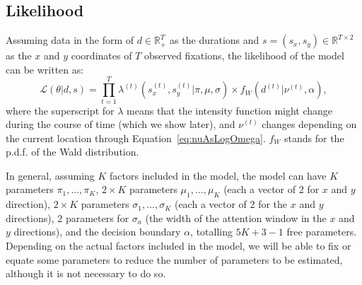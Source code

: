 \documentclass{article}
\begin{document}
\subsection{Likelihood}


Assuming data in the form of $d \in \mathbb{R}_+^T$ as the durations and $s = (s_x, s_y) \in \mathbb{R}^{T\times2}$ as the $x$ and $y$ coordinates of $T$ observed fixations, the likelihood of the model can be written as:
\begin{equation}
    \mathcal{L}(\theta | d, s) = \prod_{t=1}^T \lambda^{(t)}(s_x^{(t)}, s_y^{(t)} | \pi, \mu, \sigma) \times f_{W}(d^{(t)} | \nu^{(t)}, \alpha),
\end{equation}
where the superscript for $\lambda$ means that the intensity function might change during the course of time (which we show later), and $\nu^{(t)}$ changes depending on the current location through Equation~\ref{eq:nuAsLogOmega}. $f_W$ stands for the p.d.f. of the Wald distribution.

In general, assuming $K$ factors included in the model, the model can have $K$ parameters $\pi_1, ..., \pi_K$, $2\times K$ parameters $\mu_1, ..., \mu_K$ (each a vector of 2 for $x$ and $y$ direction), $2\times K$ parameters $\sigma_1, ..., \sigma_K$ (each a vector of 2 for the $x$ and $y$ directions), 2 parameters for $\sigma_a$ (the width of the attention window in the $x$ and $y$ directions), and the decision boundary $\alpha$, totalling $5K + 3 - 1$ free parameters. Depending on the actual factors included in the model, we will be able to fix or equate some parameters to reduce the number of parameters to be estimated, although it is not necessary to do so.




\end{document}

